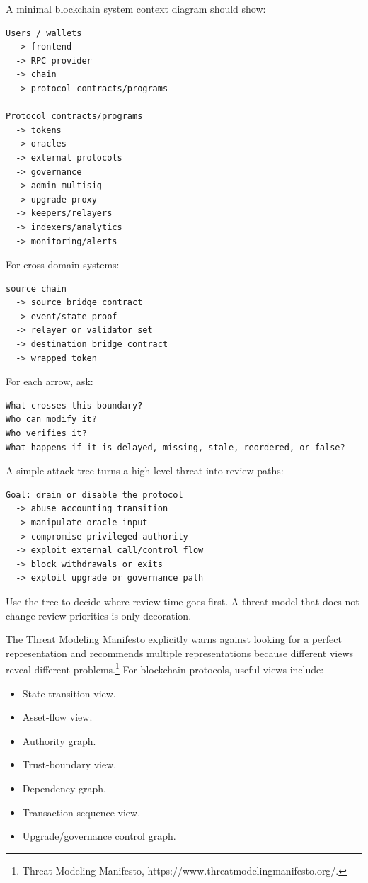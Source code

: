 A minimal blockchain system context diagram should show:

\begin{lstlisting}
Users / wallets
  -> frontend
  -> RPC provider
  -> chain
  -> protocol contracts/programs

Protocol contracts/programs
  -> tokens
  -> oracles
  -> external protocols
  -> governance
  -> admin multisig
  -> upgrade proxy
  -> keepers/relayers
  -> indexers/analytics
  -> monitoring/alerts
\end{lstlisting}

For cross-domain systems:

\begin{lstlisting}
source chain
  -> source bridge contract
  -> event/state proof
  -> relayer or validator set
  -> destination bridge contract
  -> wrapped token
\end{lstlisting}

For each arrow, ask:

\begin{lstlisting}
What crosses this boundary?
Who can modify it?
Who verifies it?
What happens if it is delayed, missing, stale, reordered, or false?
\end{lstlisting}


A simple attack tree turns a high-level threat into review paths:

\begin{lstlisting}
Goal: drain or disable the protocol
  -> abuse accounting transition
  -> manipulate oracle input
  -> compromise privileged authority
  -> exploit external call/control flow
  -> block withdrawals or exits
  -> exploit upgrade or governance path
\end{lstlisting}

Use the tree to decide where review time goes first. A threat model that does not change review priorities is only decoration.

The Threat Modeling Manifesto explicitly warns against looking for a
perfect representation and recommends multiple representations because
different views reveal different problems.\footnote{Threat Modeling
  Manifesto, https://www.threatmodelingmanifesto.org/.} For blockchain
protocols, useful views include:

\begin{itemize}
\tightlist
\item
  State-transition view.
\item
  Asset-flow view.
\item
  Authority graph.
\item
  Trust-boundary view.
\item
  Dependency graph.
\item
  Transaction-sequence view.
\item
  Upgrade/governance control graph.
\end{itemize}


